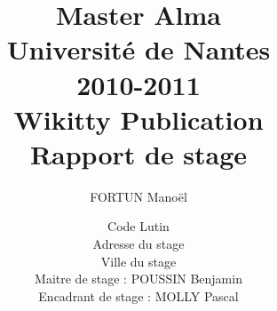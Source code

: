 \documentclass[12pt,a4paper,utf8x]{article}
\title
{
	\normalsize{Master Alma\\
	Université de Nantes\\
	2010-2011}\\
	\vspace{15mm}
	\Huge{Wikitty Publication}\\
	\normalsize{Rapport de stage}
}
\author{FORTUN Manoël\\
	\vspace{45mm}
}
\date{	
	\normalsize{Code Lutin\\
	Adresse du stage\\
	Ville du stage\\ 
	\vspace{5mm}	
	Maitre de stage : POUSSIN Benjamin \\
	Encadrant de stage : MOLLY Pascal
	}
}
\begin{document}
\maketitle

\clearpage

\newpage
\null

\newpage





\clearpage



\clearpage

\clearpage




\clearpage



\tableofcontents




\clearpage


\clearpage


\clearpage

\clearpage


\clearpage


\end{document}
